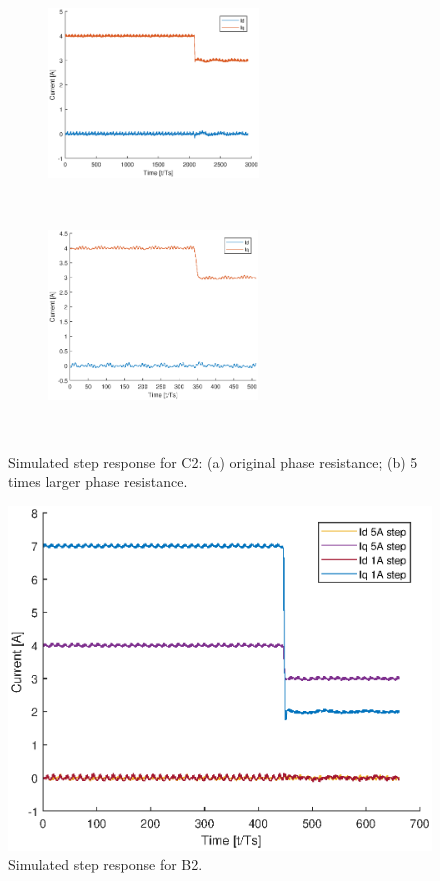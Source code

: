 \documentclass[journal]{IEEEtran}
\begin{document}
\begin{figure}[t!]
\centering
\begin{subfigure}{0.5\textwidth}
  \centering
  \includegraphics[width=0.95\linewidth, height = 45mm]{figures/C2_step.eps}
  \caption{}
  \label{fig:C2_step_sub1}
\end{subfigure}\\
\begin{subfigure}{0.5\textwidth}
  \centering
  \includegraphics[width=0.95\linewidth, height = 45mm]{figures/C2_step_5Rs.eps}
  \caption{}
  \label{fig:C2_step_sub2}
\end{subfigure}\\
\caption{Simulated step response for C2: (a) original phase resistance; (b) 5 times larger phase resistance.}
\label{fig:C2_step}
\end{figure}

\begin{figure}[t!]
    \centerline{\includegraphics[width=0.95\linewidth]{figures/B2_step.eps}}
    \caption{Simulated step response for B2.}
    \label{fig:B2_step} 
\end{figure}
\end{document}
